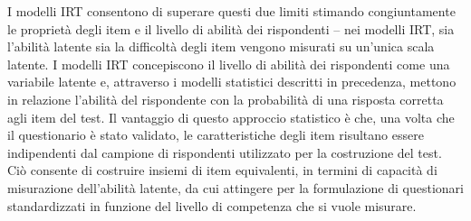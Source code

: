 I modelli IRT consentono di superare questi due limiti stimando congiuntamente le proprietà degli item e il livello di abilità dei rispondenti -- nei modelli IRT, sia l'abilità latente sia la difficoltà degli item vengono misurati su un'unica scala latente. 
I modelli IRT concepiscono il livello di abilità dei rispondenti come una variabile latente e, attraverso i modelli statistici descritti in precedenza, mettono in relazione l'abilità del rispondente con la probabilità di una risposta corretta agli item del test. 
Il vantaggio di questo approccio statistico è che, una volta che il questionario è stato validato, le caratteristiche degli item risultano essere indipendenti dal campione di rispondenti utilizzato per la costruzione del test. 
Ciò consente di costruire insiemi di item equivalenti, in termini di capacità di misurazione dell'abilità latente, da cui attingere per la formulazione di questionari standardizzati in funzione del livello di competenza che si vuole misurare. 



